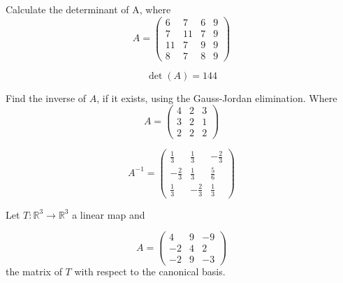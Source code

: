 \begin{questions}

\question Calculate the determinant of A, where
$$
A=\left(\begin{array}{rrrr}
6 & 7 & 6 & 9 \\
7 & 11 & 7 & 9 \\
11 & 7 & 9 & 9 \\
8 & 7 & 8 & 9
\end{array}\right)
$$

\begin{solution}
$$\det(A)=144$$
\end{solution}

\question Find the inverse of $A$, if it exists, using the Gauss-Jordan elimination. Where
$$
A=\left(\begin{array}{rrr}
4 & 2 & 3 \\
3 & 2 & 1 \\
2 & 2 & 2
\end{array}\right)
$$

\begin{solution}
$$A^{-1}=\left(\begin{array}{rrr}
\frac{1}{3} & \frac{1}{3} & -\frac{2}{3} \\
-\frac{2}{3} & \frac{1}{3} & \frac{5}{6} \\
\frac{1}{3} & -\frac{2}{3} & \frac{1}{3}
\end{array}\right)$$
\end{solution}

\question Let $T:\mathbb{R}^3\rightarrow\mathbb{R}^3$  a linear map and
 
$$
A=\left(\begin{array}{rrr}
4 & 9 & -9 \\
-2 & 4 & 2 \\
-2 & 9 & -3
\end{array}\right)
$$
the matrix of $T$ with respect to the canonical basis.
\end{questions}
